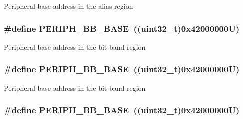 Peripheral base address in the alias region \hypertarget{group___peripheral__memory__map_gaed7efc100877000845c236ccdc9e144a}{
\subsubsection[{P\-E\-R\-I\-P\-H\-\_\-\-B\-B\-\_\-\-B\-A\-S\-E}]{\setlength{\rightskip}{0pt plus 5cm}\#define P\-E\-R\-I\-P\-H\-\_\-\-B\-B\-\_\-\-B\-A\-S\-E~((uint32\-\_\-t)0x42000000\-U)}}\label{group___peripheral__memory__map_gaed7efc100877000845c236ccdc9e144a}
Peripheral base address in the bit-\/band region \hypertarget{group___peripheral__memory__map_gaed7efc100877000845c236ccdc9e144a}{
\subsubsection[{P\-E\-R\-I\-P\-H\-\_\-\-B\-B\-\_\-\-B\-A\-S\-E}]{\setlength{\rightskip}{0pt plus 5cm}\#define P\-E\-R\-I\-P\-H\-\_\-\-B\-B\-\_\-\-B\-A\-S\-E~((uint32\-\_\-t)0x42000000\-U)}}\label{group___peripheral__memory__map_gaed7efc100877000845c236ccdc9e144a}
Peripheral base address in the bit-\/band region \hypertarget{group___peripheral__memory__map_gaed7efc100877000845c236ccdc9e144a}{
\subsubsection[{P\-E\-R\-I\-P\-H\-\_\-\-B\-B\-\_\-\-B\-A\-S\-E}]{\setlength{\rightskip}{0pt plus 5cm}\#define P\-E\-R\-I\-P\-H\-\_\-\-B\-B\-\_\-\-B\-A\-S\-E~((uint32\-\_\-t)0x42000000\-U)}}\label{group___peripheral__memory__map_gaed7efc100877000845c236ccdc9e144a}
